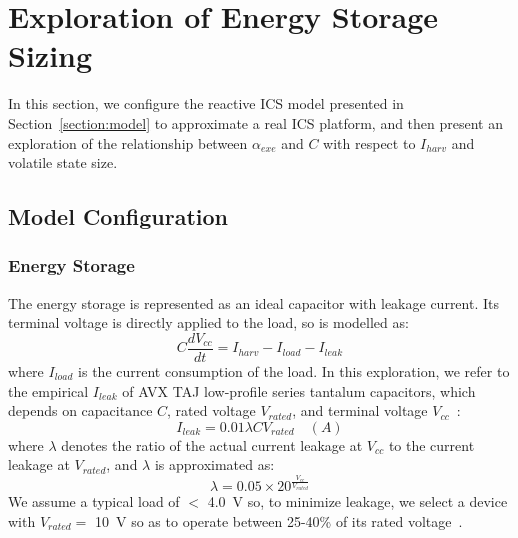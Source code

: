 
\section{Exploration of Energy Storage Sizing} \label{section:exploration}


In this section, we configure the reactive ICS model presented in Section~\ref{section:model} to approximate a real ICS platform, and then present an exploration of the relationship between $\alpha_{exe}$ and $C$ with respect to $I_{harv}$ and volatile state size.

\subsection{Model Configuration}

\subsubsection{Energy Storage}

The energy storage is represented as an ideal capacitor with leakage current. Its terminal voltage is directly applied to the load, so is modelled as:
\begin{equation}
  C \frac{dV_{cc}}{dt} = I_{harv} - I_{load} - I_{leak}
\end{equation}
where $I_{load}$ is the current consumption of the load. In this exploration, we refer to the empirical $I_{leak}$ of AVX TAJ low-profile series tantalum capacitors, which depends on capacitance $C$, rated voltage $V_{rated}$, and terminal voltage $V_{cc}$~\cite{avxleakage}:
\begin{equation}
    I_{leak} = 0.01 \lambda C V_{rated} \quad (A)
\end{equation}
where $\lambda$ denotes the ratio of the actual current leakage at $V_{cc}$ to the current leakage at $V_{rated}$, and $\lambda$ is approximated as: 
\begin{equation}
    \lambda = 0.05 \times 20^{\frac{V_{cc}}{V_{rated}}}
\end{equation}
We assume a typical load of $<$ \SI{4.0}{\volt} so, to minimize leakage, we select a device with $V_{rated} =$ \SI{10}{\volt} so as to operate between 25-40\% of its rated voltage~\cite{avxleakage}. 

